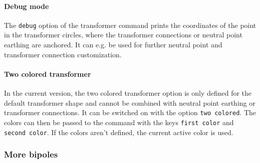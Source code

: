 \documentclass[a4]{article}
\begin{document}
\paragraph{Debug mode}
The \verb+debug+ option of the transformer command prints the coordinates of the point in the transformer circles, where the transformer connections or neutral point earthing are anchored. It can e.g. be used for further neutral point and transformer connection customization.
\begin{examplebox}
\end{examplebox}
\paragraph{Two colored transformer } In the current version, the two colored transformer option is only defined for the default transformer shape and cannot be combined with neutral point earthing or transformer connections. It can be switched on with the option \verb+two colored+. The colors can then be passed to the command with the keys \verb+first color+ and \verb+second color+. If the colors aren't defined, the current active color is used.
\begin{examplebox}
\end{examplebox}
\subsubsection{More bipoles}
\end{document}
